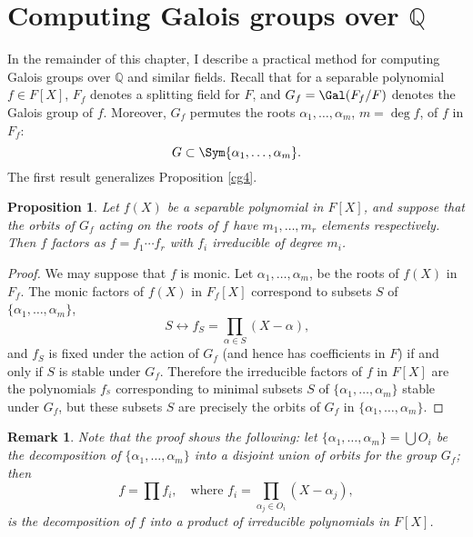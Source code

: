 \documentclass[a4paper,11pt,final,openany]{memoir}
\newtheorem{proposition}[X]{Proposition}
\newtheorem{remark}[X]{Remark}
\theoremstyle{nonumberplain}
\newtheorem{proof}{Proof.}
\begin{document}
\section{Computing Galois groups over \texorpdfstring{$\mathbb{Q}$}{Q}}

In the remainder of this chapter, I describe a practical method for computing
Galois groups over $\mathbb{Q}$ and similar fields. Recall that for a
separable polynomial $f\in F[X]$, $F_{f}$ denotes a splitting field for $F$,
and $G_{f}=\Gal(F_{f}/F)$ denotes the Galois group of $f$. Moreover, $G_{f}$
permutes the roots $\alpha_{1},\ldots,\alpha_{m}$, $m=\deg f$, of $f$ in
$F_{f}$:%
\[
G\subset\Sym\{\alpha_{1},\ldots,\alpha_{m}\}\text{.}%
\]
The first result generalizes Proposition \ref{cg4}.

\begin{proposition}
\label{cg19}Let $f(X)$ be a separable polynomial in $F[X]$, and suppose that
the orbits of $G_{f}$ acting on the roots of $f$ have $m_{1},\ldots,m_{r}$
elements respectively. Then $f$ factors as $f=f_{1}\cdots f_{r}$ with $f_{i}$
irreducible of degree $m_{i}$.
\end{proposition}

\begin{proof}
We may suppose that $f$ is monic. Let $\alpha_{1},\ldots,\alpha_{m}$, be the
roots of $f(X)$ in $F_{f}$. The monic factors of $f(X)$ in $F_{f}[X]$
correspond to subsets $S$ of $\{\alpha_{1},\ldots,\alpha_{m}\}$,
\[
S\leftrightarrow f_{S}=\prod_{\alpha\in S}(X-\alpha)\text{,}%
\]
and $f_{S}$ is fixed under the action of $G_{f}$ (and hence has coefficients
in $F$) if and only if $S$ is stable under $G_{f}$. Therefore the irreducible
factors of $f$ in $F[X]$ are the polynomials $f_{^{S}}$ corresponding to
minimal subsets $S$ of $\{\alpha_{1},\ldots,\alpha_{m}\}$ stable under $G_{f}%
$, but these subsets $S$ are precisely the orbits of $G_{f}$ in $\{\alpha
_{1},\ldots,\alpha_{m}\}$.
\end{proof}

\begin{remark}
\label{cg19m}Note that the proof shows the following: let $\{\alpha_{1}%
,\ldots,\alpha_{m}\}=\bigcup O_{i}$ be the decomposition of $\{\alpha
_{1},\ldots,\alpha_{m}\}$ into a disjoint union of orbits for the group
$G_{f}$; then%
\[
f=\prod f_{i},\quad\text{where }f_{i}=\prod_{\alpha_{j}\in O_{i}}(X-\alpha
_{j}),
\]
is the decomposition of $f$ into a product of irreducible polynomials in
$F[X]$.
\end{remark}
\end{document}
